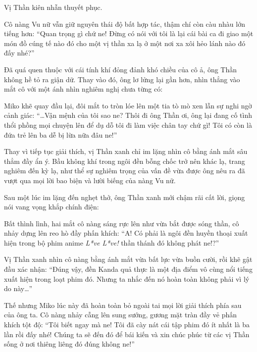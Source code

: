 \documentclass[../main.tex]{subfiles}
\begin{document}
 Vị Thần kiên nhẫn thuyết phục. 

Cô nàng Vu nữ vẫn giữ nguyên thái độ bất hợp tác, thậm chí còn càu nhàu lớn tiếng hơn: ``Quan trọng gì chứ ne! Đừng có nói với tôi là lại cái bài ca đi giao một món đồ cúng tế nào đó cho một vị thần xa lạ ở một nơi xa xôi hẻo lánh nào đó đấy nhé?''

Đã quá quen thuộc với cái tính khí đỏng đảnh khó chiều của cô ả, ông Thần không hề tỏ ra giận dữ. Thay vào đó, ông lơ lửng lại gần hơn, nhìn thẳng vào mắt cô với một ánh nhìn nghiêm nghị chưa từng có:


Miko khẽ quay đầu lại, đôi mắt to tròn lóe lên một tia tò mò xen lẫn sự nghi ngờ cảnh giác: ``\dots Vận mệnh của tôi sao ne? Thôi đi ông Thần ơi, ông lại đang cố tình thổi phồng mọi chuyện lên để dụ dỗ tôi đi làm việc chân tay chứ gì! Tôi có còn là đứa trẻ lên ba dễ bị lừa nữa đâu ne!''

Thay vì tiếp tục giải thích, vị Thần xanh chỉ im lặng nhìn cô bằng ánh mắt sâu thẳm đầy ẩn ý. Bầu không khí trong ngôi đền bỗng chốc trở nên khác lạ, trang nghiêm đến kỳ lạ, như thể sự nghiêm trọng của vấn đề vừa được ông nêu ra đã vượt qua mọi lời bao biện và lười biếng của nàng Vu nữ.

Sau một lúc im lặng đến nghẹt thở, ông Thần xanh mới chậm rãi cất lời, giọng nói vang vọng khắp chính điện: 


Bất thình lình, hai mắt cô nàng sáng rực lên như vừa bắt được sóng thần, cô nhảy dựng lên reo hò đầy phấn khích: ``A! Có phải là ngôi đền huyền thoại xuất hiện trong bộ phim anime \textit{L*ve L*ve!} thần thánh đó không phát ne!?''

Vị Thần xanh nhìn cô nàng bằng ánh mắt vừa bất lực vừa buồn cười, rồi khẽ gật đầu xác nhận: ``Đúng vậy, đền Kanda quả thực là một địa điểm vô cùng nổi tiếng xuất hiện trong loạt phim đó. Nhưng ta nhắc đến nó hoàn toàn không phải vì lý do này\dots''

Thế nhưng Miko lúc này đã hoàn toàn bỏ ngoài tai mọi lời giải thích phía sau của ông ta. Cô nàng nhảy cẫng lên sung sướng, gương mặt tràn đầy vẻ phấn khích tột độ: ``Tôi biết ngay mà ne! Tôi đã cày nát cái tập phim đó ít nhất là ba lần rồi đấy nhé! Chúng ta sẽ đến đó để bái kiến và xin chúc phúc từ các vị Thần sống ở nơi thiêng liêng đó đúng không ne!''
\end{document}
